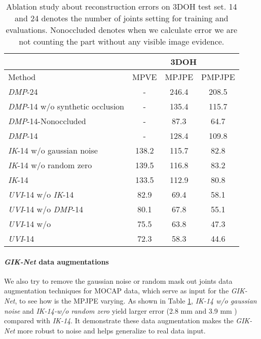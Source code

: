 \documentclass[10pt,twocolumn,letterpaper]{article}
\begin{document}
\begin{table}
\begin{center}
\small
\begin{tabular}{l |c|c|c }
\hline
        &  \multicolumn{3}{c}{3DOH}  \\
\hline
Method  &  MPVE & MPJPE & PMPJPE  \\
\hline
\textit{DMP}-24    & -  & 246.4   & 208.5  \\
\textit{DMP}-14  w/o synthetic occlusion  & -  &  135.4 & 115.7 \\
\textit{DMP}-14-Nonoccluded    & -  &  87.3 & 64.7 \\
\textit{DMP}-14    & -  &  128.4 & 109.8 \\
\hline


\textit{IK}-14 w/o gaussian noise    & 138.2  &  115.7  & 82.8 \\
\textit{IK}-14 w/o random zero    & 139.5  &  116.8  & 83.2 \\
\textit{IK}-14     & 133.5  &  112.9  & 80.8 \\
\hline
\textit{UVI}-14  w/o \textit{IK}-14   &   82.9 &  69.4 & 58.1  \\
\textit{UVI}-14  w/o \textit{DMP}-14   &   80.1  &   67.8 &  55.1  \\
\textit{UVI}-14  w/o    & 75.5   &  63.8  &  47.3 \\
\textit{UVI}-14     &  72.3  & 58.3   & 44.6  \\
\hline
\end{tabular}
\end{center}
\caption{Ablation study about reconstruction errors on 3DOH test set. 14 and 24 denotes the number of joints setting for training and evaluations. Nonoccluded denotes when we calculate error we are not counting the part without any visible image evidence.}
\label{table:3dohablstions}
\end{table}

\paragraph{\textit{GIK-Net} data augmentations} We also try to remove the gaussian noise or random mask out joints data augmentation techniques for MOCAP data, which serve as input for the \textit{GIK-Net}, to see how is the MPJPE varying. 
As shown in Table \ref{table:3dohablstions}, \textit{IK-14 w/o gaussian noise} and \textit{IK-14-w/o random zero} yield larger error (2.8 mm and 3.9 mm ) compared with \textit{IK-14}. It demonstrate these data augmentation makes the \textit{GIK-Net} more robust to noise and helps generalize to real data input.  
\end{document}
